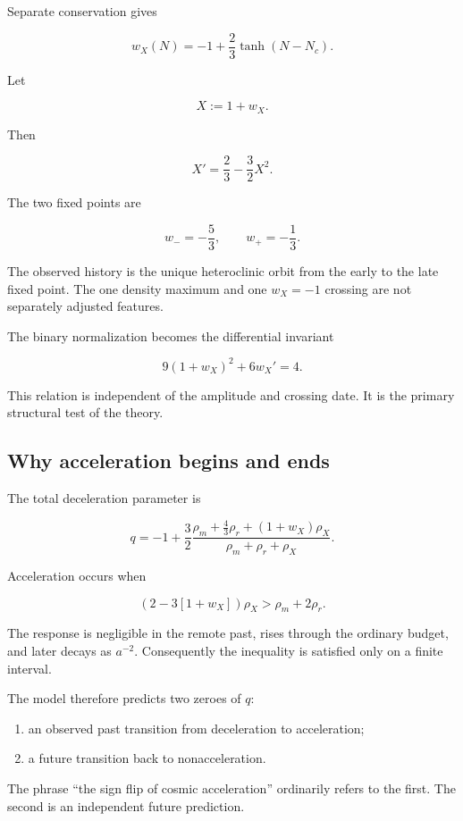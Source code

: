 \documentclass[
  11pt,
  letterpaper,
]{article}
\providecommand{\tightlist}{%
  \setlength{\itemsep}{0pt}\setlength{\parskip}{0pt}}
\begin{document}
Separate conservation gives

\[
\boxed{
w_X(N)=-1+\frac23\tanh(N-N_c).
}
\]

Let

\[
X:=1+w_X.
\]

Then

\[
\boxed{
X'=\frac23-\frac32X^2.
}
\]

The two fixed points are

\[
w_-=-\frac53,
\qquad
w_+=-\frac13.
\]

The observed history is the unique heteroclinic orbit from the early to
the late fixed point. The one density maximum and one \(w_X=-1\)
crossing are not separately adjusted features.

The binary normalization becomes the differential invariant

\[
\boxed{
9(1+w_X)^2+6w_X'=4.
}
\]

This relation is independent of the amplitude and crossing date. It is
the primary structural test of the theory.

\subsection{Why acceleration begins and
ends}\label{why-acceleration-begins-and-ends}

The total deceleration parameter is

\[
q=-1+\frac32
\frac{
\rho_m+\frac43\rho_r+(1+w_X)\rho_X
}{
\rho_m+\rho_r+\rho_X
}.
\]

Acceleration occurs when

\[
\boxed{
(2-3[1+w_X])\rho_X>\rho_m+2\rho_r.
}
\]

The response is negligible in the remote past, rises through the
ordinary budget, and later decays as \(a^{-2}\). Consequently the
inequality is satisfied only on a finite interval.

The model therefore predicts two zeroes of \(q\):

\begin{enumerate}
\def\labelenumi{\arabic{enumi}.}
\tightlist
\item
  an observed past transition from deceleration to acceleration;
\item
  a future transition back to nonacceleration.
\end{enumerate}

The phrase ``the sign flip of cosmic acceleration'' ordinarily refers to
the first. The second is an independent future prediction.
\end{document}
